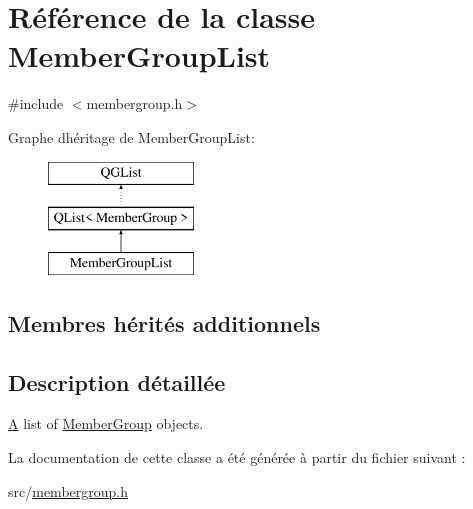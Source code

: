 \hypertarget{class_member_group_list}{}\section{Référence de la classe Member\+Group\+List}
\label{class_member_group_list}


{\ttfamily \#include $<$membergroup.\+h$>$}

Graphe d\textquotesingle{}héritage de Member\+Group\+List\+:\begin{figure}[H]
\begin{center}
\leavevmode
\includegraphics[height=3.000000cm]{class_member_group_list}
\end{center}
\end{figure}
\subsection*{Membres hérités additionnels}


\subsection{Description détaillée}
\hyperlink{class_a}{A} list of \hyperlink{class_member_group}{Member\+Group} objects. 

La documentation de cette classe a été générée à partir du fichier suivant \+:\begin{DoxyCompactItemize}
\item 
src/\hyperlink{membergroup_8h}{membergroup.\+h}\end{DoxyCompactItemize}
